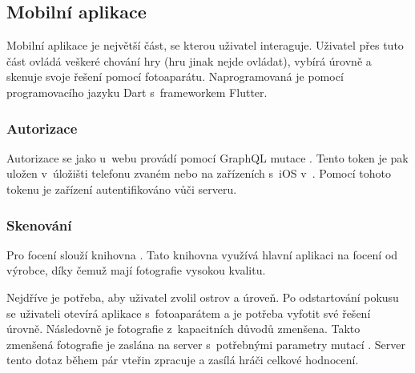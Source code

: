 \subsection{Mobilní aplikace}
Mobilní aplikace je největší část, se kterou uživatel interaguje. Uživatel přes tuto část ovládá veškeré chování hry (hru jinak nejde ovládat), vybírá úrovně a skenuje svoje řešení pomocí fotoaparátu. Naprogramovaná je pomocí programovacího jazyku Dart s~frameworkem Flutter. 

\subsubsection{Autorizace}
Autorizace se jako u~webu provádí pomocí GraphQL mutace . Tento token je pak uložen v~úložišti telefonu zvaném \cite{SharedPreferences} nebo na zařízeních s~iOS v~\cite{NSUserDefaults}. Pomocí tohoto tokenu je zařízení autentifikováno vůči serveru.

\subsubsection{Skenování}
Pro focení slouží knihovna \cite{ImagePicker}. Tato knihovna využívá hlavní aplikaci na focení od výrobce, díky čemuž mají fotografie vysokou kvalitu.\par
Nejdříve je potřeba, aby uživatel zvolil ostrov a úroveň. Po odstartování pokusu se uživateli otevírá aplikace s~fotoaparátem a je potřeba vyfotit své řešení úrovně. Následovně je fotografie z~kapacitních důvodů zmenšena. Takto zmenšená fotografie je zaslána na server s~potřebnými parametry mutací . Server tento dotaz během pár vteřin zpracuje a zasílá hráči celkové hodnocení.
